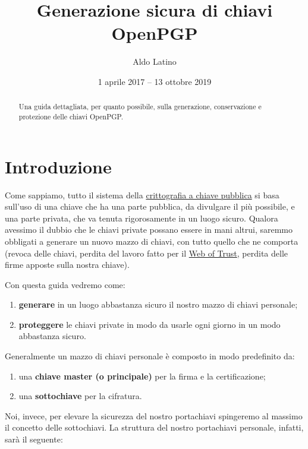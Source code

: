 \documentclass[a4paper,10pt]{article}
\title{Generazione sicura di chiavi OpenPGP}
\author{Aldo Latino}
\date{1 aprile 2017 -- 13 ottobre 2019}
\begin{document}
\maketitle


\begin{abstract}
Una guida dettagliata, per quanto possibile, sulla generazione, conservazione e protezione delle chiavi OpenPGP.
\end{abstract}

\tableofcontents

\newpage

\section{Introduzione}

Come sappiamo, tutto il sistema della \href{https://it.wikipedia.org/wiki/Crittografia_asimmetrica}{crittografia a chiave pubblica} si basa sull'uso di una chiave che ha una parte pubblica, da divulgare il più possibile, e una parte privata, che va tenuta rigorosamente in un luogo sicuro. Qualora avessimo il dubbio che le chiavi private possano essere in mani altrui, saremmo obbligati a generare un nuovo mazzo di chiavi, con tutto quello che ne comporta (revoca delle chiavi, perdita del lavoro fatto per il \href{https://it.wikipedia.org/wiki/Web_of_trust}{Web of Trust}, perdita delle firme apposte sulla nostra chiave).

Con questa guida vedremo come:

\begin{enumerate}
 \item \textbf{generare} in un luogo abbastanza sicuro il nostro mazzo di chiavi personale;
 \item \textbf{proteggere} le chiavi private in modo da usarle ogni giorno in un modo abbastanza sicuro.
\end{enumerate}

Generalmente un mazzo di chiavi personale è composto in modo predefinito da:

\begin{enumerate}
 \item una \textbf{chiave master (o principale)} per la firma e la certificazione;
 \item una \textbf{sottochiave} per la cifratura.
\end{enumerate}

Noi, invece, per elevare la sicurezza del nostro portachiavi spingeremo al massimo il concetto delle sottochiavi. La struttura del nostro portachiavi personale, infatti, sarà il seguente:
\end{document}
